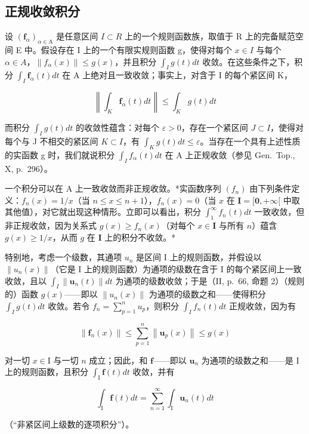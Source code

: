 \subsection{正规收敛积分}

设 \((\mathbf{f}_{\alpha})_{\alpha\in\mathrm{A}}\) 是任意区间 \(I\subset R\) 上的一个规则函数族，取值于 R 上的完备赋范空间 E 中。假设存在 I 上的一个有限实规则函数 g，使得对每个 \(x\in I\) 与每个 \(\alpha\in A\)，\(\|f_{\alpha}(x)\|\leqslant g(x)\)，并且积分 \(\int_{I}g(t)dt\) 收敛。在这些条件之下，积分 \(\int_{I}\mathbf{f}_{\alpha}(t)dt\) 在 A 上绝对且一致收敛；事实上，对含于 I 的每个紧区间 K，

\[
\left\| \int_ {K} \mathbf {f} _ {\alpha} (t) d t \right\| \leqslant \int_ {K} g (t) d t
\]

而积分 \(\int_{I} g(t) dt\) 的收敛性蕴含：对每个 \(\varepsilon > 0\)，存在一个紧区间 \(J \subset I\)，使得对每个与 J 不相交的紧区间 \(K \subset I\)，有 \(\int_{K} g(t) dt \leqslant \varepsilon\)。当存在一个具有上述性质的实函数 g 时，我们就说积分 \(\int_{I} f_{\alpha}(t) dt\) 在 A 上正规收敛（参见 Gen.~Top., X, p.~296）。

一个积分可以在 A 上一致收敛而非正规收敛。*实函数序列 \((f_n)\) 由下列条件定义：\(f_n(x) = 1 / x\)（当 \(n \leqslant x \leqslant n + 1\)），\(f_n(x) = 0\)（当 \(x\) 在 \(\mathbf{I} = [\mathbf{0}, +\infty[\) 中取其他值），对它就出现这种情形。立即可以看出，积分 \(\int_{1}^{\infty} f_n(t) dt\) 一致收敛，但非正规收敛，因为关系式 \(g(x) \geqslant f_n(x)\)（对每个 \(x \in \mathbf{I}\) 与所有 \(n\)）蕴含 \(g(x) \geqslant 1 / x\)，从而 \(g\) 在 \(\mathbf{I}\) 上的积分不收敛。*

特别地，考虑一个级数，其通项 \(u_{n}\) 是区间 I 上的规则函数，并假设以 \(\|u_{n}(x)\|\)（它是 I 上的规则函数）为通项的级数在含于 I 的每个紧区间上一致收敛，且以 \(\int_{I}\|\mathbf{u}_{n}(t)\|dt\) 为通项的级数收敛；于是（II, p.~66, 命题 2）（规则的）函数 \(g(x)\)——即以 \(\|u_{n}(x)\|\) 为通项的级数之和——使得积分 \(\int_{I}g(t)dt\) 收敛。若令 \(f_{n}=\sum_{p=1}^{n}u_{p}\)，则积分 \(\int_{I}f_{n}(t)dt\) 正规收敛，因为有

\[
\left\| \mathbf {f} _ {n} (x) \right\| \leqslant \sum_ {p = 1} ^ {n} \left\| \mathbf {u} _ {p} (x) \right\| \leqslant g (x)
\]

对一切 \(x \in \mathrm{I}\) 与一切 \(n\) 成立；因此，和 \(\mathbf{f}\)——即以 \(\mathbf{u}_n\) 为通项的级数之和——是 \(\mathrm{I}\) 上的规则函数，且积分 \(\int_{\mathrm{I}} \mathbf{f}(t) dt\) 收敛，并有

\[
\int_ {\mathrm{I}} \mathbf {f} (t) d t = \sum_ {n = 1} ^ {\infty} \int_ {\mathrm{I}} \mathbf {u} _ {n} (t) d t\tag{11}
\]

（“非紧区间上级数的逐项积分”）。

